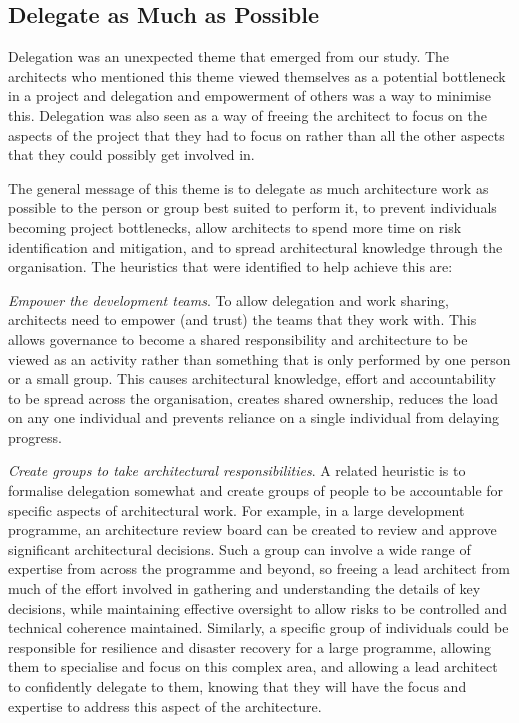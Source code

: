 \subsection{Delegate as Much as Possible}

Delegation was an unexpected theme that emerged from our study. The architects who mentioned this theme viewed themselves as a potential bottleneck in a project and delegation and empowerment of others was a way to minimise this.  Delegation was also seen as a way of freeing the architect to focus on the aspects of the project that they had to focus on rather than all the other aspects that they could possibly get involved in.

The general message of this theme is to delegate as much architecture work as possible to the person or group best suited to perform it, to prevent individuals becoming project bottlenecks, allow architects to spend more time on risk identification and mitigation, and to spread architectural knowledge through the organisation.  The heuristics that were identified to help achieve this are:

\begin{description}
	\item \emph{Empower the development teams}. To allow delegation and work sharing, architects need to empower (and trust) the teams that they work with.  This allows governance to become a shared responsibility and architecture to be viewed as an activity rather than something that is only performed by one person or a small group.  This causes architectural knowledge, effort and accountability to be spread across the organisation, creates shared ownership, reduces the load on any one individual and prevents reliance on a single individual from delaying progress.
	\item \emph{Create groups to take architectural responsibilities}.  A related heuristic is to formalise delegation somewhat and create groups of people to be accountable for specific aspects of architectural work.  For example, in a large development programme, an architecture review board can be created to review and approve significant architectural decisions.  Such a group can involve a wide range of expertise from across the programme and beyond, so freeing a lead architect from much of the effort involved in gathering and understanding the details of key decisions, while maintaining effective oversight to allow risks to be controlled and technical coherence maintained.  Similarly, a specific group of individuals could be responsible for resilience and disaster recovery for a large programme, allowing them to specialise and focus on this complex area, and allowing a lead architect to confidently delegate to them, knowing that they will have the focus and expertise to address this aspect of the architecture.
\end{description}

